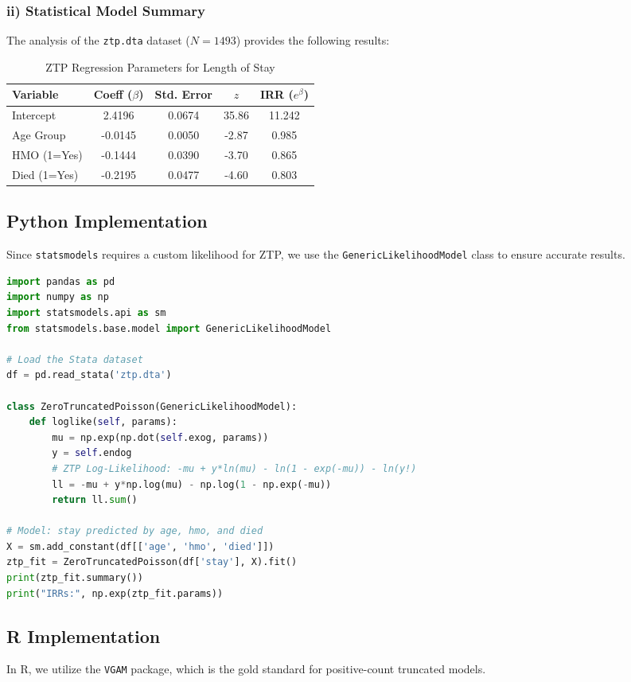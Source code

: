 \documentclass[12pt]{article}
\begin{document}
\subsubsection{ii) Statistical Model Summary}
The analysis of the \texttt{ztp.dta} dataset ($N=1493$) provides the following results:
\begin{table}[h!]
\centering
\caption{ZTP Regression Parameters for Length of Stay}
\begin{tabular}{@{}lcccc@{}}
\toprule
Variable & Coeff ($\beta$) & Std. Error & $z$ & IRR ($e^\beta$) \\ \midrule
Intercept & 2.4196 & 0.0674 & 35.86 & 11.242 \\
Age Group & -0.0145 & 0.0050 & -2.87 & 0.985 \\
HMO (1=Yes) & -0.1444 & 0.0390 & -3.70 & 0.865 \\
Died (1=Yes) & -0.2195 & 0.0477 & -4.60 & 0.803 \\ \bottomrule
\end{tabular}
\end{table}

\subsection{Python Implementation}
Since \texttt{statsmodels} requires a custom likelihood for ZTP, we use the \texttt{GenericLikelihoodModel} class to ensure accurate results.

\begin{lstlisting}[language=Python, caption=Python implementation for ZTP]
import pandas as pd
import numpy as np
import statsmodels.api as sm
from statsmodels.base.model import GenericLikelihoodModel

# Load the Stata dataset
df = pd.read_stata('ztp.dta')

class ZeroTruncatedPoisson(GenericLikelihoodModel):
    def loglike(self, params):
        mu = np.exp(np.dot(self.exog, params))
        y = self.endog
        # ZTP Log-Likelihood: -mu + y*ln(mu) - ln(1 - exp(-mu)) - ln(y!)
        ll = -mu + y*np.log(mu) - np.log(1 - np.exp(-mu))
        return ll.sum()

# Model: stay predicted by age, hmo, and died
X = sm.add_constant(df[['age', 'hmo', 'died']])
ztp_fit = ZeroTruncatedPoisson(df['stay'], X).fit()
print(ztp_fit.summary())
print("IRRs:", np.exp(ztp_fit.params))
\end{lstlisting}

\subsection{R Implementation}
In R, we utilize the \texttt{VGAM} package, which is the gold standard for positive-count truncated models.
\end{document}
